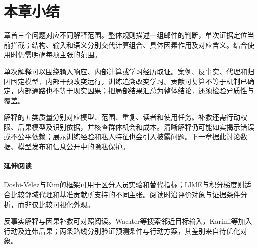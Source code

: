 \section{本章小结}
\label{sec:interpretability-summary}

章首三个问题对应不同解释范围。整体规则描述一组邮件的判断，单次证据定位当前拦截；结构、输入和语义分别交代计算组合、具体因素作用及对应含义。结合使用时仍需明确每项主张的范围。

单次解释可以围绕输入响应、内部计算或学习经历取证。案例、反事实、代理和归因固定模型，内部干预改变运行，训练追溯改变学习。贡献可复算不等于机制已确定，内部通路也不等于现实因果；把局部结果汇总为整体结论，还须检验异质性与覆盖。

解释的五类质量分别对应模型、范围、重复、读者和使用任务。补救还需行动权限、后果模型及识别依据，并核查群体机会和成本。清晰解释仍可能如实揭示错误或不公平依赖；展示训练经验和私人特征也会引入披露问题。下一章据此讨论数据、模型发布和信息公开中的隐私保护。

\paragraph{延伸阅读}

Doshi-Velez与Kim的框架可用于区分人员实验和替代指标；LIME与积分梯度则适合比较邻域代理和基准贡献所支持的不同主张。阅读时沿评价对象与证据条件分析，而非仅比较可视化外观。

反事实解释与因果补救可对照阅读。Wachter等搜索邻近目标输入，Karimi等加入行动及连带后果；两条路线分别验证预测条件与行动方案，其差别来自待优化对象。
